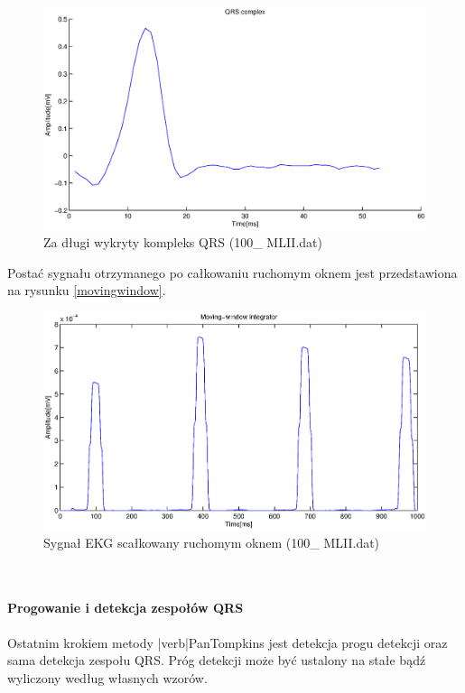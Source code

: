 \documentclass[a4paper, 11pt]{article}
\begin{document}
\begin{figure}
\centering
\includegraphics[scale=0.3]{include/qrslong.eps}
\caption{Za długi wykryty kompleks QRS (100\_ MLII.dat)}
\label{qrslong}
\end{figure}
\newpage
\indent Postać sygnału otrzymanego po całkowaniu ruchomym oknem jest przedstawiona na rysunku \eqref{movingwindow}.\\
\begin{figure}
\centering
\includegraphics[scale=0.5]{include/movingwindow.eps}
\caption{Sygnał EKG scałkowany ruchomym oknem (100\_ MLII.dat)}
\label{movingwindow}
\end{figure}\\
\paragraph{Progowanie i detekcja zespołów QRS}
Ostatnim krokiem metody |verb|PanTompkins jest detekcja progu detekcji oraz sama detekcja zespołu QRS. Próg detekcji może być ustalony na stałe bądź wyliczony według własnych wzorów.
\end{document}
